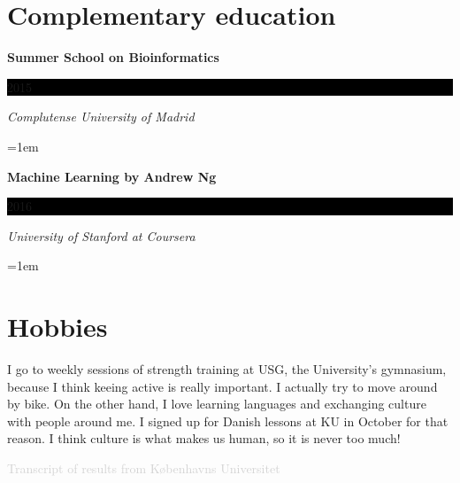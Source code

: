 \documentclass[paper=a4,fontsize=11pt]{article} %
\newcommand{\sepspace}{\vspace*{1em}}		%
\newcommand{\NewPart}[1]{\section*{
									{#1}}}
\newcommand{\EducationEntry}[4]{
		\noindent \textbf{#1} \hfill      %
		\colorbox{Black}{%
			\parbox{6em}{%
			\hfill\color{White}#2}} \par  %
		\noindent \textit{#3} \par        %
		\noindent\hangindent=1em\hangafter=0 \small #4 %
		\normalsize \par}
\newcommand{\AwardEntry}[4]{
		\noindent \textbf{#1} \hfill      %
		\colorbox{Black}{%
			\parbox{3em}{%
			\hfill\color{White}#2}} \par  %
		\noindent \textit{#3} \par        %
		  \noindent\hangindent=1em\hangafter=0 \small #4  %
		\normalsize \par}
\begin{document}
  
\NewPart{Complementary education}{}


\AwardEntry{Summer School on Bioinformatics}{2015}{Complutense University of Madrid}{}  
  


\AwardEntry{Machine Learning by Andrew Ng}{2016}{University of Stanford at Coursera}{}






%
%


\NewPart{Hobbies}
I go to weekly sessions of strength training at USG, the University's gymnasium, because I think keeing active is really important. I actually try to move around by bike. On the other hand, I love learning languages and exchanging culture with people around me. I signed up for Danish lessons at KU in October for that reason. I think culture is what makes us human, so it is never too much!





\vfill
\textcolor{lightgray}{Transcript of results from K{\o}benhavns Universitet}


%
%



\end{document}

